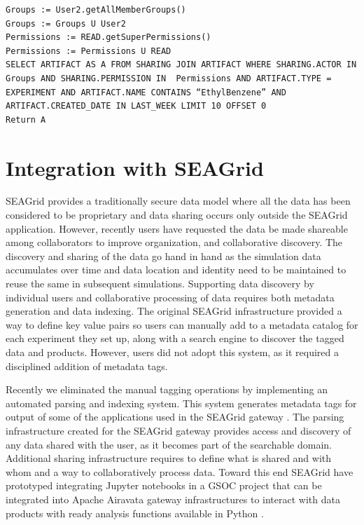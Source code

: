 \documentclass[sigconf]{acmart}
\begin{document}
\begin{lstlisting}
Groups := User2.getAllMemberGroups()
Groups := Groups U User2
Permissions := READ.getSuperPermissions()
Permissions := Permissions U READ
SELECT ARTIFACT AS A FROM SHARING JOIN ARTIFACT WHERE SHARING.ACTOR IN Groups AND SHARING.PERMISSION IN  Permissions AND ARTIFACT.TYPE = EXPERIMENT AND ARTIFACT.NAME CONTAINS “EthylBenzene” AND ARTIFACT.CREATED_DATE IN LAST_WEEK LIMIT 10 OFFSET 0
Return A
\end{lstlisting}

\section{Integration with SEAGrid}

SEAGrid provides a traditionally secure data model where all the data has been considered to be proprietary and data sharing occurs only outside the SEAGrid application. However, recently users have requested the data be made shareable among collaborators to improve organization,  and collaborative discovery. The discovery and sharing of the data go hand in hand as the simulation data accumulates over time and data location and identity need to be maintained to reuse the same in subsequent simulations. Supporting data discovery by individual users and collaborative processing of data requires both metadata generation and data indexing. The original SEAGrid infrastructure provided a way to define key value pairs so users can manually add to a metadata catalog for each experiment they set up, along with a search engine to discover the tagged data and products. However, users did not adopt this system, as it required a disciplined addition of metadata tags.  

Recently we eliminated the manual tagging operations by implementing an automated parsing and indexing system. This system generates metadata tags for output of some of the applications used in the SEAGrid gateway \cite{nakandala2016anatomy}. The parsing infrastructure created for the SEAGrid gateway provides access and discovery of any data shared with the user, as it becomes part of the searchable domain. Additional sharing infrastructure requires to define what is shared and with whom and a way to collaboratively process data. Toward this end SEAGrid have prototyped integrating Jupyter notebooks in a GSOC project that can be integrated into Apache Airavata gateway infrastructures to interact with data products with ready analysis functions available in Python \cite{xsedeGateways}.   
\end{document}
